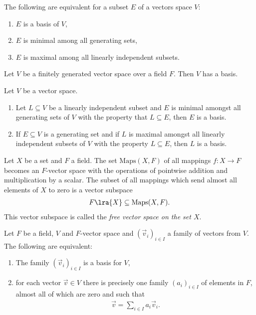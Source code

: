 \documentclass{article}
\begin{document}
\begin{theorem}[Theorem 1.5.12]
	The following are equivalent for a subset $E$ of a vectors space $V$:
	\begin{enumerate}
		\item $E$ is a basis of $V$,
		\item $E$ is minimal among all generating sets,
		\item $E$ is maximal among all linearly independent subsets.
	\end{enumerate}
\end{theorem}

\begin{corollary}[Corollary 1.5.13]
	Let $V$ be a finitely generated vector space over a field $F$. Then $V$
	has a basis.
\end{corollary}

\begin{theorem}[Theorem 1.5.14]
	Let $V$ be a vector space.
	\begin{enumerate}
		\item Let $L\subseteq V$ be a linearly independent subset and $E$ is minimal
		      amongst all generating sets of $V$ with the property that $L\subseteq E$,
		      then $E$ is a basis.
		\item If $E\subseteq V$ is a generating set and if $L$ is maximal amongst all
		      linearly independent subsets of $V$ with the property $L\subseteq E$, then
		      $L$ is a basis.
	\end{enumerate}
\end{theorem}

\begin{definition}
	Let $X$ be a set and $F$ a field. The set $\text{Maps}(X,F)$ of all mappings
	$f:X\to F$ becomes an $F$-vector space with the operations of pointwise
	addition and multiplication by a scalar. The subset of all mappings which send
	almost all elements of $X$ to zero is a vector subspace
	\begin{align*}
		F\lra{X}\subseteq \text{Maps}(X,F).
	\end{align*}
	This vector subspace is called the \emph{free vector space on the set $X$}.
\end{definition}

\begin{theorem}[Theorem 1.5.16]
	Let $F$ be a field, $V$ and $F$-vector space and $(\vec v_i)_{i\in I}$ a
	family of vectors from $V$. The following are equivalent:
	\begin{enumerate}
		\item The family $(\vec v_i)_{i\in I}$ is a basis for $V$,
		\item for each vector $\vec v\in V$ there is precisely one family $(a_i)_{i\in I}$
		      of elements in $F$, almost all of which are zero and such that \begin{align*}
			      \vec v = \sum_{i\in I}a_i\vec v_i.
		      \end{align*}
	\end{enumerate}
\end{theorem}
\end{document}
